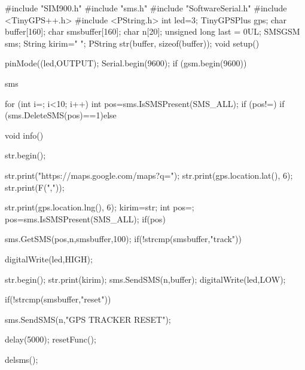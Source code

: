 #include "SIM900.h"
#include "sms.h"
#include "SoftwareSerial.h"
#include <TinyGPS++.h>
#include <PString.h>
int led=3;
TinyGPSPlus gps;
char buffer[160];
char smsbuffer[160];
char n[20];
unsigned long last = 0UL;
SMSGSM sms;
String kirim=" ";
PString str(buffer, sizeof(buffer));
void setup(){
  pinMode((led,OUTPUT);
  Serial.begin(9600);
  if (gsm.begin(9600))

  sms














for (int i=; i<10; i++)
 {  
int pos=sms.IsSMSPresent(SMS_ALL);
if (pos!=)
      {
if (sms.DeleteSMS(pos)==1){}else{}
     }
  }
}

void info(){
  str.begin();

str.print("https://maps.google.com/maps?q=");
str.print(gps.location.lat(), 6);
str.print(F(","));

str.print(gps.location.lng(), 6);
    kirim=str;
int pos=;
pos=sms.IsSMSPresent(SMS_ALL);
if(pos){

    sms.GetSMS(pos,n,smsbuffer,100);
if(!strcmp(smsbuffer,"track")){
    digitalWrite(led,HIGH);
 
 
      str.begin();
str.print(kirim);
sms.SendSMS(n,buffer);
 digitalWrite(led,LOW); 
 }
    if(!strcmp(smsbuffer,"reset")){

sms.SendSMS(n,"GPS TRACKER RESET");

 delay(5000);
resetFunc(); 
   }
    delsms();
  }
  
  
}